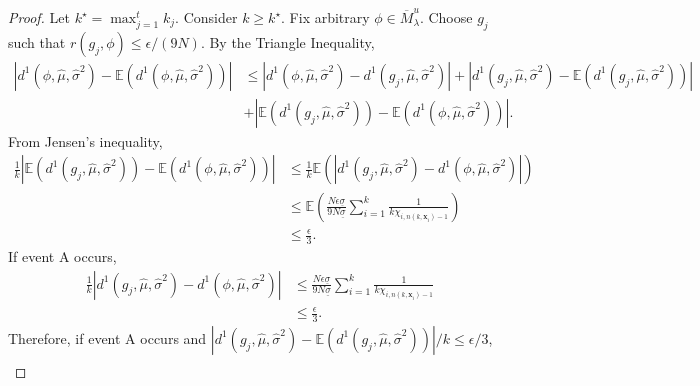 \documentclass[12pt]{article}
\newcommand{\des}{\ensuremath{\bm{x}}}
\begin{document}
\begin{proof}
    Let $k^\star=\max_{j=1}^t k_j$. Consider $k\geq k^\star$. Fix arbitrary $\phi \in \overline{M}^u_\lambda$. Choose $g_j$ such that $r(g_j,\phi)\leq \epsilon/(9N)$. By the Triangle Inequality,
    \begin{equation*}
        \begin{split}
           \left |d^1(\phi,\hat{\mu},\hat{\sigma}^2)-\mathbb{E}\left ( d^1(\phi,\hat{\mu},\hat{\sigma}^2)\right )\right |&\leq \left |d^1(\phi,\hat{\mu},\hat{\sigma}^2)-d^1(g_j,\hat{\mu},\hat{\sigma}^2) \right | +\left | d^1(g_j,\hat{\mu},\hat{\sigma}^2)-\mathbb{E}\left ( d^1(g_j,\hat{\mu},\hat{\sigma}^2)\right ) \right |\\
           & +\left |\mathbb{E}\left ( d^1(g_j,\hat{\mu},\hat{\sigma}^2)\right )-\mathbb{E}\left ( d^1(\phi,\hat{\mu},\hat{\sigma}^2)\right ) \right |.
        \end{split}
    \end{equation*}
    From Jensen's inequality,
    \begin{equation*}
        \begin{split}
            \frac{1}{k}\left |\mathbb{E}\left ( d^1(g_j,\hat{\mu},\hat{\sigma}^2)\right )-\mathbb{E}\left ( d^1(\phi,\hat{\mu},\hat{\sigma}^2)\right ) \right |&\leq  \frac{1}{k}\mathbb{E}\left (\left | d^1(g_j,\hat{\mu},\hat{\sigma}^2)- d^1(\phi,\hat{\mu},\hat{\sigma}^2) \right |\right )\\
            &\leq \mathbb{E}\left ( \frac{N\epsilon\underline{\sigma}}{9N\underline{\sigma}}\sum_{i=1}^k\frac{1}{k\chi_{i,n(k,\des_i)-1}} \right )\\
            &\leq \frac{\epsilon}{3}.
        \end{split}
    \end{equation*}
    If event A occurs, 
    \begin{equation*}
        \begin{split}
             \frac{1}{k}\left | d^1(g_j,\hat{\mu},\hat{\sigma}^2)- d^1(\phi,\hat{\mu},\hat{\sigma}^2) \right |& \leq  \frac{N\epsilon\underline{\sigma}}{9N\underline{\sigma}}\sum_{i=1}^k\frac{1}{k\chi_{i,n(k,\des_i)-1}} \\
            & \leq \frac{\epsilon}{3}.
        \end{split}
    \end{equation*}
    Therefore, if event A occurs and $\left | d^1(g_j,\hat{\mu},\hat{\sigma}^2)-\mathbb{E}\left ( d^1(g_j,\hat{\mu},\hat{\sigma}^2)\right ) \right |/k\leq \epsilon/3$,
    \begin{equation*}
        \begin{split}

\end{split}
\end{equation*}
\end{proof}
\end{document}
